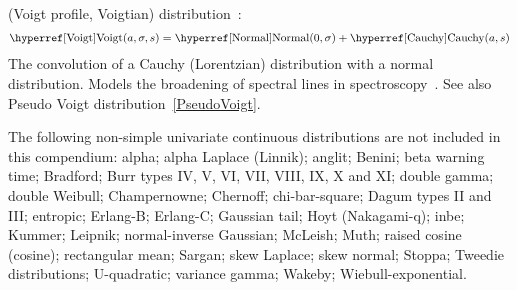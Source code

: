 \secbreak
{} (Voigt profile, Voigtian) distribution~\cite{Armstrong1967}:
\begin{align}
\label{Voigt}
\opr{Voigt}(a,\sigma,s) = \opr{Normal}(0,\sigma) + \opr{Cauchy}(a,s) \checked
\end{align}
The convolution of a Cauchy (Lorentzian) distribution with a normal distribution. Models the broadening of spectral lines in spectroscopy~\cite{Armstrong1967}. See also Pseudo Voigt distribution~\eqref{PseudoVoigt}.







The following non-simple univariate continuous distributions are not included in this compendium:
%
%
%
%
alpha;
alpha Laplace (Linnik);	%
anglit;				%
Benini;
beta warning time;
Bradford; 	%
Burr types IV, V, VI, VII, VIII, IX, X and XI;
double gamma; %
double Weibull; 
Champernowne;
Chernoff;
chi-bar-square;
Dagum types II and III;	%
entropic;
Erlang-B;
Erlang-C;
Gaussian tail;	%
Hoyt (Nakagami-q); %
inbe;
Kummer;
Leipnik;
normal-inverse Gaussian;
McLeish;			%
Muth;
raised cosine (cosine);
rectangular mean;
Sargan;								%
skew Laplace;
skew normal;
Stoppa;	%
Tweedie distributions;		
U-quadratic;
variance gamma; 
Wakeby;
Wiebull-exponential.



